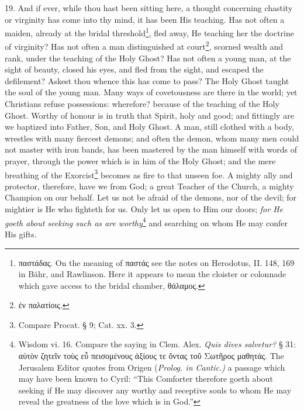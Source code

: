 19. And if ever, while thou hast been sitting here, a thought concerning chastity or virginity has come into thy mind, it has been His teaching. Has not often a maiden, already at the bridal threshold\footnote{\textgreek{παστάδας}. On the meaning of \textgreek{παστάς} see the notes on Herodotus, II. 148, 169 in Bähr, and Rawlinson. Here it appears to mean the cloister or colonnade which gave access to the bridal chamber, \textgreek{θάλαμος}.}, fled away, He teaching her the doctrine of virginity? Has not often a man distinguished at court\footnote{\textgreek{ἐν παλατίοις}.}, scorned wealth and rank, under the teaching of the Holy Ghost? Has not often a young man, at the sight of beauty, closed his eyes, and fled from the sight, and escaped the defilement? Askest thou whence this has come to pass? The Holy Ghost taught the soul of the young man. Many ways of covetousness are there in the world; yet Christians refuse possessions: wherefore? because of the teaching of the Holy Ghost. Worthy of honour is in truth that Spirit, holy and good; and fittingly are we baptized into Father, Son, and Holy Ghost. A man, still clothed with a body, wrestles with many fiercest demons; and often the demon, whom many men could not master with iron bands, has been mastered by the man himself with words of prayer, through the power which is in him of the Holy Ghost; and the mere breathing of the Exorcist\footnote{Compare Procat. § 9; Cat. xx. 3.} becomes as fire to that unseen foe. A mighty ally and protector, therefore, have we from God; a great Teacher of the Church, a mighty Champion on our behalf. Let us not be afraid of the demons, nor of the devil; for mightier is He who fighteth for us. Only let us open to Him our doors; \emph{for He goeth about seeking such as are worthy}\footnote{Wisdom vi. 16. Compare the saying in Clem. Alex. \emph{Quis dives salvetur?} § 31: \textgreek{αὐτὸν ζητεῖν τοὺς εὖ πεισομένους ἀξίους τε ὄντας τοῦ Σωτῆρος μαθητάς}. The Jerusalem Editor quotes from Origen (\emph{Prolog. in Cantic.)} a passage which may have been known to Cyril: “This Comforter therefore goeth about seeking if He may discover any worthy and receptive souls to whom He may reveal the greatness of the love which is in God.”} and searching on whom He may confer His gifts.

